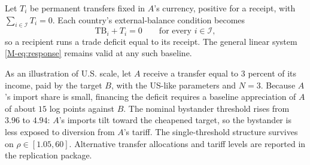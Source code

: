 \documentclass[11pt]{article}
\numberwithin{equation}{section}
\theoremstyle{plain}
\newcommand{\TB}{\mathrm{TB}}
\begin{document}
Let $T_i$ be permanent transfers fixed in $A$'s currency, positive for a receipt, with $\sum_{i\in\mathcal I}T_i=0$. Each country's external-balance condition becomes
\begin{equation*}
\TB_i+T_i=0\qquad\text{for every }i\in\mathcal I,
\end{equation*}
so a recipient runs a trade deficit equal to its receipt. The general linear system \cref{M-eq:response} remains valid at any such baseline.

As an illustration of U.S. scale, let $A$ receive a transfer equal to 3 percent of its income, paid by the target $B$, with the US-like parameters and $N=3$. Because $A$'s import share is small, financing the deficit requires a baseline appreciation of $A$ of about $15$ log points against $B$. The nominal bystander threshold rises from $3.96$ to $4.94$: $A$'s imports tilt toward the cheapened target, so the bystander is less exposed to diversion from $A$'s tariff. The single-threshold structure survives on $\rho\in[1.05,60]$. Alternative transfer allocations and tariff levels are reported in the replication package.

\clearpage
\singlespacing


\end{document}
